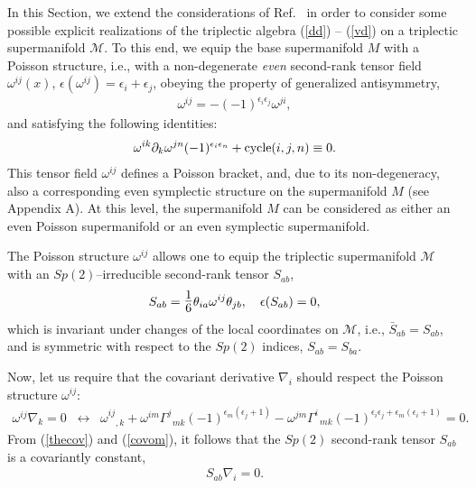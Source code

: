 \documentclass[a4paper,11pt]{article}
\begin{document}
In this Section, we extend the considerations of Ref.~\cite{3pl}
in order to consider some possible explicit realizations of the
triplectic algebra (\ref {dd}) -- (\ref{vd}) on a triplectic
supermanifold $\mathcal{M}$. To this end, we equip the base
supermanifold $M$ with a Poisson structure, i.e., with a
non-degenerate \emph{even} second-rank tensor field $\omega
^{ij}(x)$, $\epsilon (\omega ^{ij})=\epsilon _{i}+\epsilon _{j}$,
obeying the property of generalized antisymmetry,
\begin{eqnarray}
\label{symomega}
\omega^{ij}=-(-1)^{\epsilon_i\epsilon_j}\omega^{ji},
\end{eqnarray}
and satisfying the following identities:
\begin{eqnarray}
\label{jiomega}
\omega^{ik}\partial_k\omega^{jn}
(-1)^{\epsilon_i\epsilon_n} + {\rm cycle} (i,j,n)\equiv 0.
\end{eqnarray}
This tensor field $\omega ^{ij}$ defines a Poisson bracket, and, due to its
non-degeneracy, also a corresponding even symplectic structure on the
supermanifold $M$ (see Appendix A). At this level, the supermanifold $M$ can
be considered as either an even Poisson supermanifold or an even symplectic
supermanifold.

The Poisson structure $\omega ^{ij}$ allows one to equip the triplectic
supermanifold $\mathcal{M}$ with an $Sp(2)$--irreducible second-rank tensor $%
S_{ab} $,
\begin{eqnarray}
\label{Sab}
S_{ab}=\hbox{\Large$\frac{1}{6}$}\theta_{ia}\omega^{ij}\theta_{jb},
\quad \epsilon(S_{ab})=0,
\end{eqnarray}
which is invariant under changes of the local coordinates on $\mathcal{M}$,
i.e., ${\bar{S}}_{ab}=S_{ab}$, and is symmetric with respect to the $Sp(2)$
indices, $S_{ab}=S_{ba}$.

Now, let us require that the covariant derivative $\nabla _{i}$
should respect the Poisson structure $\omega ^{ij}$:
\begin{eqnarray}
\label{covom} \omega^{ij}\nabla_k=0 \;\; \leftrightarrow \;\;
\omega^{ij}_{\;\;\;,k}+\omega^{im}
\Gamma^j_{\;\;mk}(-1)^{\epsilon_m(\epsilon_j+1)}-
\omega^{jm}\Gamma^i_{\;\;mk}
(-1)^{\epsilon_i\epsilon_j+\epsilon_m(\epsilon_i+1)}=0.
\end{eqnarray}
From (\ref{thecov}) and (\ref{covom}), it follows that the $Sp(2)$ second-rank
tensor $S_{ab}$ is a covariantly constant,
\begin{eqnarray}
\label{conSab}
S_{ab}\nabla_i=0.
\end{eqnarray}
\end{document}
